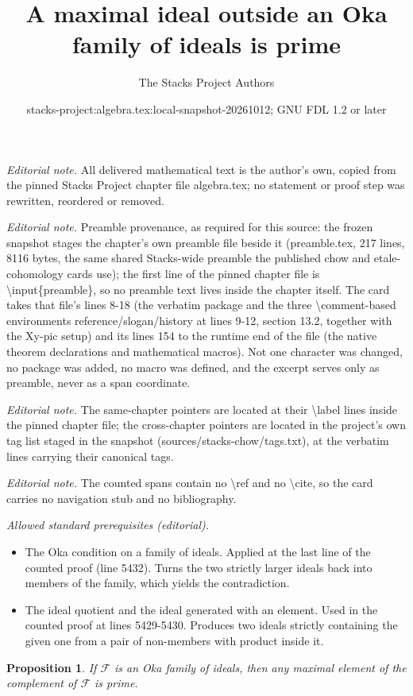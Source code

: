 \documentclass[10pt,a4paper]{amsart}
\title{A maximal ideal outside an Oka family of ideals is prime}
\author{The Stacks Project Authors}
\date{stacks-project:algebra.tex:local-snapshot-20261012; GNU FDL 1.2 or later}
\theoremstyle{plain}
\newtheorem{proposition}[subsection]{Proposition}
\theoremstyle{definition}
\theoremstyle{remark}
\numberwithin{equation}{subsection}
\begin{document}
\maketitle
\noindent\textit{Editorial note.} All delivered mathematical text is the author's own, copied from the pinned Stacks Project chapter file algebra.tex; no statement or proof step was rewritten, reordered or removed.\par\medskip
\noindent\textit{Editorial note.} Preamble provenance, as required for this source: the frozen snapshot stages the chapter's own preamble file beside it (preamble.tex, 217 lines, 8116 bytes, the same shared Stacks-wide preamble the published chow and etale-cohomology cards use); the first line of the pinned chapter file is \textbackslash{}input\{preamble\}, so no preamble text lives inside the chapter itself. The card takes that file's lines 8-18 (the verbatim package and the three \textbackslash{}comment-based environments reference/slogan/history at lines 9-12, section 13.2, together with the Xy-pic setup) and its lines 154 to the runtime end of the file (the native theorem declarations and mathematical macros). Not one character was changed, no package was added, no macro was defined, and the excerpt serves only as preamble, never as a span coordinate.\par\medskip
\noindent\textit{Editorial note.} The same-chapter pointers are located at their \textbackslash{}label lines inside the pinned chapter file; the cross-chapter pointers are located in the project's own tag list staged in the snapshot (sources/stacks-chow/tags.txt), at the verbatim lines carrying their canonical tags.\par\medskip
\noindent\textit{Editorial note.} The counted spans contain no \textbackslash{}ref and no \textbackslash{}cite, so the card carries no navigation stub and no bibliography.\par\medskip
\noindent\textit{Allowed standard prerequisites (editorial).}\begin{itemize}
\item The Oka condition on a family of ideals. Applied at the last line of the counted proof (line 5432). Turns the two strictly larger ideals back into members of the family, which yields the contradiction.
\item The ideal quotient and the ideal generated with an element. Used in the counted proof at lines 5429-5430. Produces two ideals strictly containing the given one from a pair of non-members with product inside it.
\end{itemize}\medskip
\begin{proposition}
\label{proposition-oka}
If $\mathcal{F}$ is an Oka family of ideals, then any maximal element of
the complement of $\mathcal{F}$ is prime.
\end{proposition}
\end{document}
